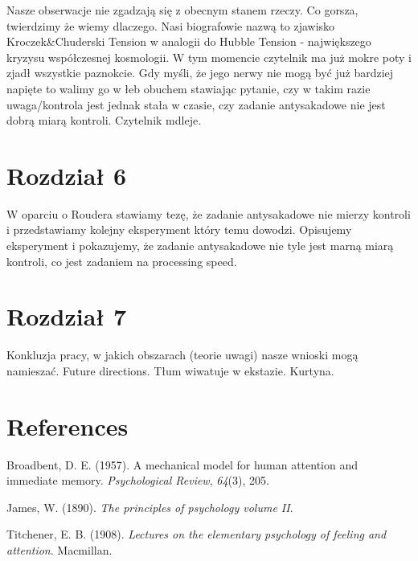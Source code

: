 \documentclass[
  man,draftall]{apa6}
\newlength{\cslhangindent}
\newlength{\cslentryspacingunit} %
\newenvironment{CSLReferences}[2] %
 {%
  \setlength{\parindent}{0pt}
  \ifodd #1
  \let\oldpar\par
  \def\par{\hangindent=\cslhangindent\oldpar}
  \fi
  \setlength{\parskip}{#2\cslentryspacingunit}
 }%
 {}
\begin{document}
Nasze obserwacje nie zgadzają się z obecnym stanem rzeczy. Co gorsza, twierdzimy że wiemy dlaczego. Nasi biografowie nazwą to zjawisko Kroczek\&Chuderski Tension w analogii do Hubble Tension - największego kryzysu współczesnej kosmologii. W tym momencie czytelnik ma już mokre poty i zjadł wszystkie paznokcie. Gdy myśli, że jego nerwy nie mogą być już bardziej napięte to walimy go w łeb obuchem stawiając pytanie, czy w takim razie uwaga/kontrola jest jednak stała w czasie, czy zadanie antysakadowe nie jest dobrą miarą kontroli. Czytelnik mdleje.

\hypertarget{rozdziaux142-6}{%
\section{Rozdział 6}\label{rozdziaux142-6}}

W oparciu o Roudera stawiamy tezę, że zadanie antysakadowe nie mierzy kontroli i przedstawiamy kolejny eksperyment który temu dowodzi.
Opisujemy eksperyment i pokazujemy, że zadanie antysakadowe nie tyle jest marną miarą kontroli, co jest zadaniem na processing speed.

\hypertarget{rozdziaux142-7}{%
\section{Rozdział 7}\label{rozdziaux142-7}}

Konkluzja pracy, w jakich obszarach (teorie uwagi) nasze wnioski mogą namieszać. Future directions. Tłum wiwatuje w ekstazie. Kurtyna.

\hypertarget{references}{%
\section{References}\label{references}}

\hypertarget{refs}{}
\begin{CSLReferences}{1}{0}
\leavevmode{}%
Broadbent, D. E. (1957). A mechanical model for human attention and immediate memory. \emph{Psychological Review}, \emph{64}(3), 205.

\leavevmode{}%
James, W. (1890). \emph{The principles of psychology volume II}.

\leavevmode{}%
Titchener, E. B. (1908). \emph{Lectures on the elementary psychology of feeling and attention}. Macmillan.

\end{CSLReferences}
\end{document}
